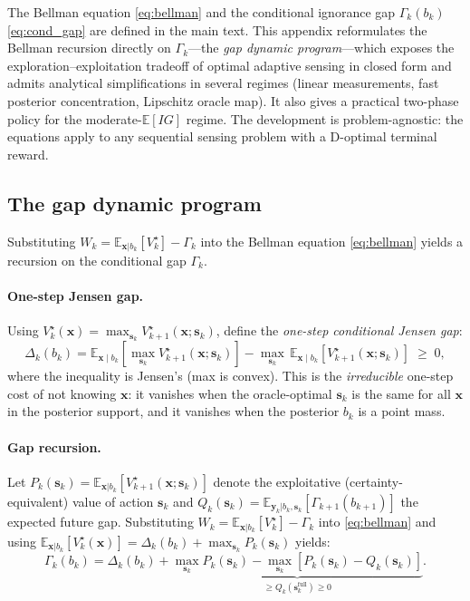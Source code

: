 \documentclass[11pt,a4paper]{article}
\newcommand{\E}{\mathbb{E}}
\begin{document}
The Bellman equation \eqref{eq:bellman} and the conditional ignorance gap $\Gamma_k(b_k)$ \eqref{eq:cond_gap} are defined in the main text.  This appendix reformulates the Bellman recursion directly on $\Gamma_k$---the \emph{gap dynamic program}---which exposes the exploration--exploitation tradeoff of optimal adaptive sensing in closed form and admits analytical simplifications in several regimes (linear measurements, fast posterior concentration, Lipschitz oracle map).  It also gives a practical two-phase policy for the moderate-$\E[IG]$ regime.  The development is problem-agnostic: the equations apply to any sequential sensing problem with a D-optimal terminal reward.

\subsection{The gap dynamic program}

Substituting $W_k = \E_{\bm{x}|b_k}[V_k^\star] - \Gamma_k$ into the Bellman equation \eqref{eq:bellman} yields a recursion on the conditional gap $\Gamma_k$.

\paragraph{One-step Jensen gap.}
Using $V_k^\star(\bm{x}) = \max_{\bm{s}_k} V_{k+1}^\star(\bm{x};\bm{s}_k)$, define the \emph{one-step conditional Jensen gap}:
\begin{equation}
  \Delta_k(b_k) = \E_{\bm{x} \mid b_k}\!\left[\max_{\bm{s}_k} V_{k+1}^\star(\bm{x};\bm{s}_k)\right] - \max_{\bm{s}_k}\, \E_{\bm{x} \mid b_k}\!\left[V_{k+1}^\star(\bm{x};\bm{s}_k)\right] \;\geq\; 0,
  \label{eq:jensen_gap}
\end{equation}
where the inequality is Jensen's (max is convex).  This is the \emph{irreducible} one-step cost of not knowing $\bm{x}$: it vanishes when the oracle-optimal $\bm{s}_k$ is the same for all $\bm{x}$ in the posterior support, and it vanishes when the posterior $b_k$ is a point mass.

\paragraph{Gap recursion.}
Let $P_k(\bm{s}_k) = \E_{\bm{x}|b_k}[V_{k+1}^\star(\bm{x};\bm{s}_k)]$ denote the exploitative (certainty-equivalent) value of action $\bm{s}_k$ and $Q_k(\bm{s}_k) = \E_{\bm{y}_k|b_k,\bm{s}_k}[\Gamma_{k+1}(b_{k+1})]$ the expected future gap.  Substituting $W_k = \E_{\bm{x}|b_k}[V_k^\star] - \Gamma_k$ into \eqref{eq:bellman} and using $\E_{\bm{x}|b_k}[V_k^\star(\bm{x})] = \Delta_k(b_k) + \max_{\bm{s}_k} P_k(\bm{s}_k)$ yields:
\begin{equation}
  \boxed{\Gamma_k(b_k) = \Delta_k(b_k) + \underbrace{\max_{\bm{s}_k}P_k(\bm{s}_k) - \max_{\bm{s}_k}[P_k(\bm{s}_k) - Q_k(\bm{s}_k)]}_{\displaystyle \ge Q_k(\bm{s}_k^{\text{full}}) \ge 0}.}
  \label{eq:gap_dp}
\end{equation}
\end{document}
